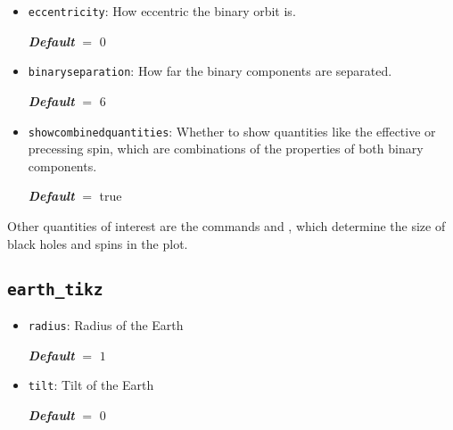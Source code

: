\documentclass[
    DIV=11,
    BCOR=0mm,
    paper=a4,
    fontsize=11pt,
    twoside=false,
    titlepage=true
]{scrartcl}
\newcommand{\code}[1]{\textcolor{codecolor}{\texttt{#1}}}
\newcommand{\defaultval}[1]{%
    {\bfseries\slshape%
    Default} $=$ #1%
}
\begin{document}
\begin{itemize}
    \defaultval{$0$}


    \item \code{eccentricity}: How eccentric the binary orbit is.
    
    \defaultval{$0$}


    \item \code{binaryseparation}: How far the binary components are separated.
    
    \defaultval{$6$}


    \item \code{showcombinedquantities}: Whether to show quantities like the effective or precessing spin, which are combinations of the properties of both binary components.
    
    \defaultval{true}
\end{itemize}

Other quantities of interest are the commands \code{\string\BHsizepersolmass} and \code{\string\UnitSpinSize}, which determine the size of black holes and spins in the plot.



        \subsection{\texttt{earth\_tikz}}
\begin{itemize}
    \item \code{radius}: Radius of the Earth
    
    \defaultval{$1$}


    \item \code{tilt}: Tilt of the Earth
    
    \defaultval{$0$}
\end{itemize}
\end{document}
